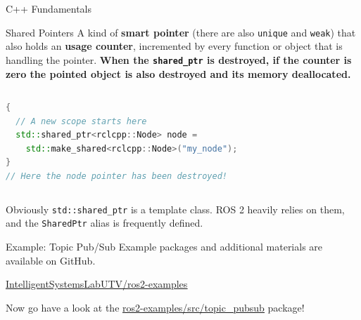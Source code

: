\begin{frame}[fragile]{C++ Fundamentals}
\begin{block}{Shared Pointers}
A kind of \textbf{smart pointer} (there are also \texttt{unique} and \texttt{weak}) that also holds an \textbf{usage counter}, incremented by every function or object that is handling the pointer. \textbf{When the \texttt{shared\_ptr} is destroyed, if the counter is zero the pointed object is also destroyed and its memory deallocated.}

\begin{columns}
\begin{lstlisting}[language=C++, caption=Example of shared pointer creation]
{
  // A new scope starts here
  std::shared_ptr<rclcpp::Node> node =
    std::make_shared<rclcpp::Node>("my_node");
}
// Here the node pointer has been destroyed!
\end{lstlisting}
\end{columns}

Obviously \texttt{std::shared\_ptr} is a template class. ROS 2 heavily relies on them, and the \texttt{SharedPtr} alias is frequently defined.
\end{block}
\end{frame}

\begin{frame}{Example: Topic Pub/Sub}
Example packages and additional materials are available on GitHub.
\begin{block}{}
  \centering
  \href{https://github.com/IntelligentSystemsLabUTV/ros2-examples}{\color{blue}\underline{IntelligentSystemsLabUTV/ros2-examples}}
\end{block}
Now go have a look at the \href{https://github.com/IntelligentSystemsLabUTV/ros2-examples/tree/galactic/src/topic_pubsub}{\color{blue}\underline{ros2-examples/src/topic\_pubsub}} package!
\end{frame}
